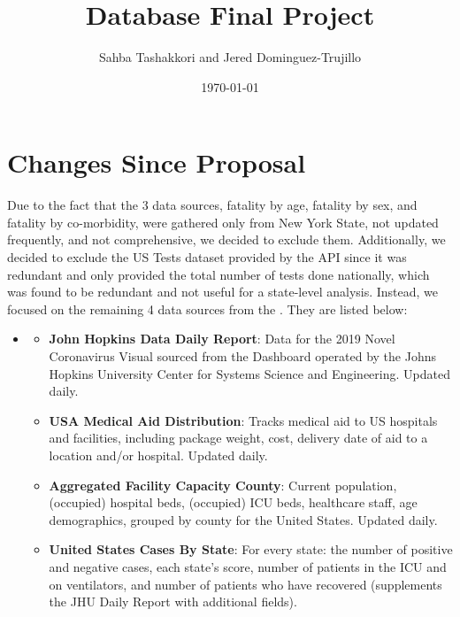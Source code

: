 \documentclass[11pt]{article}
\newcommand{\MYhref}[3][blue]{\href{#2}{\color{#1}{#3}}}%
\begin{document}
\title{Database Final Project}
\date{\today}
\author{Sahba Tashakkori and Jered Dominguez-Trujillo}

\maketitle
{}
\begin{center}
\end{center}
\newpage
\tableofcontents
{}

\pagebreak

\section{Changes Since Proposal}
\noindent
Due to the fact that the 3 data sources, fatality by age, fatality by sex, and fatality by co-morbidity, were gathered only from New York State, not updated frequently, and not comprehensive, we decided to exclude them. Additionally, we decided to exclude the US Tests dataset provided by the API since it was redundant and only provided the total number of tests done nationally, which was found to be redundant and not useful for a state-level analysis. Instead, we focused on the remaining 4 data sources from the  \MYhref{https://www.npmjs.com/package/covid19-api}{Covid-19 API}. They are listed below:

\begin{itemize}
    \item \MYhref{https://www.npmjs.com/package/covid19-api}{Covid-19 API}
        \begin{itemize}
        \item \textbf{John Hopkins Data Daily Report}: Data for the 2019 Novel Coronavirus Visual sourced from the Dashboard operated by the Johns Hopkins University Center for Systems Science and Engineering. Updated daily.
        \item \textbf{USA Medical Aid Distribution}: Tracks medical aid to US hospitals and facilities, including package weight, cost, delivery date of aid to a location and/or hospital. Updated daily.
        \item \textbf{Aggregated Facility Capacity County}: Current population, (occupied) hospital beds, (occupied) ICU beds, healthcare staff, age demographics, grouped by county for the United States. Updated daily.
        \item \textbf{United States Cases By State}: For every state: the number of positive and negative cases, each state's score, number of patients in the ICU and on ventilators, and number of patients who have recovered (supplements the JHU Daily Report with additional fields).
    \end{itemize} 
\end{itemize}
\end{document}
